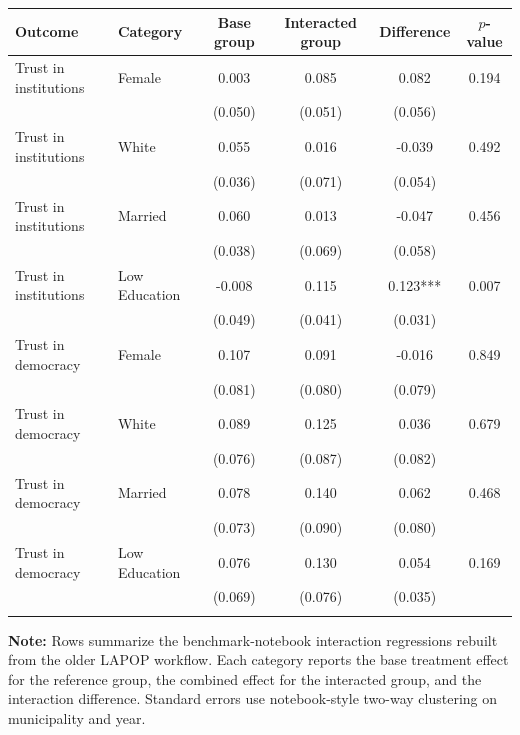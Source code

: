 \begin{tabular*}{\textwidth}{@{\extracolsep{\fill}}llcccc}
\doubletoprule
Outcome & Category & Base group & Interacted group & Difference & $p$-value \\
\midrule
Trust in institutions & Female & 0.003 & 0.085 & 0.082 & 0.194 \\
 &  & (0.050) & (0.051) & (0.056) & \\
Trust in institutions & White & 0.055 & 0.016 & -0.039 & 0.492 \\
 &  & (0.036) & (0.071) & (0.054) & \\
Trust in institutions & Married & 0.060 & 0.013 & -0.047 & 0.456 \\
 &  & (0.038) & (0.069) & (0.058) & \\
Trust in institutions & Low Education & -0.008 & 0.115 & 0.123*** & 0.007 \\
 &  & (0.049) & (0.041) & (0.031) & \\
\midrule
Trust in democracy & Female & 0.107 & 0.091 & -0.016 & 0.849 \\
 &  & (0.081) & (0.080) & (0.079) & \\
Trust in democracy & White & 0.089 & 0.125 & 0.036 & 0.679 \\
 &  & (0.076) & (0.087) & (0.082) & \\
Trust in democracy & Married & 0.078 & 0.140 & 0.062 & 0.468 \\
 &  & (0.073) & (0.090) & (0.080) & \\
Trust in democracy & Low Education & 0.076 & 0.130 & 0.054 & 0.169 \\
 &  & (0.069) & (0.076) & (0.035) & \\
\doublebottomrule
\end{tabular*}

\begin{minipage}{\textwidth}
\footnotesize
\textbf{Note:} Rows summarize the benchmark-notebook interaction regressions rebuilt from the older LAPOP workflow. Each category reports the base treatment effect for the reference group, the combined effect for the interacted group, and the interaction difference. Standard errors use notebook-style two-way clustering on municipality and year.
\end{minipage}
